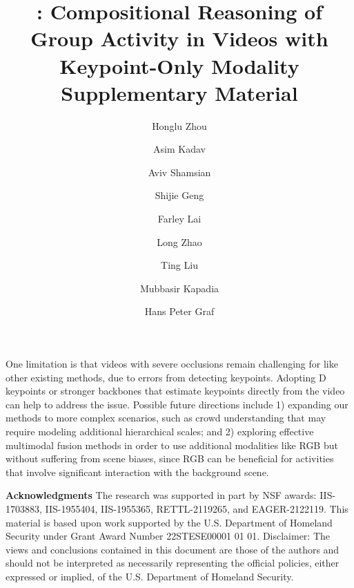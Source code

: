 \documentclass[runningheads]{llncs}
\begin{document}
One limitation is that videos with severe occlusions remain
challenging for \ours like other existing methods, due to errors from detecting keypoints. Adopting D keypoints or stronger backbones that estimate keypoints directly from the video~\cite{pavllo20193d,mediapipeBlazePose} can help to address
the issue. 
Possible future directions include 1)
expanding our methods to more complex scenarios, such as crowd understanding that may require modeling additional hierarchical scales;
and 2) exploring
effective 
multimodal fusion methods in order to use additional modalities like RGB but without suffering from scene biases, 
since RGB can be beneficial for activities that involve significant interaction with the background scene. 


\textbf{Acknowledgments}
The research was supported in part by NSF awards: IIS-1703883, IIS-1955404, IIS-1955365, RETTL-2119265, and EAGER-2122119.
This material is based upon work supported by the U.S. Department of Homeland Security under Grant Award Number 22STESE00001 01 01.
Disclaimer: The views and conclusions contained in this document are those of the authors and should not be interpreted as necessarily representing the official policies, either expressed or implied, of the U.S. Department of Homeland Security.

  


 
 
 
 
  
 
 

 





\clearpage
\title{\ourseos: Compositional Reasoning of Group Activity in Videos with Keypoint-Only Modality Supplementary Material}




\author{Honglu Zhou
\and
Asim Kadav \and
Aviv Shamsian \and
Shijie Geng \and
Farley Lai \and
Long Zhao \and
Ting Liu \and
Mubbasir Kapadia \and
Hans Peter Graf}
\maketitle
\end{document}
